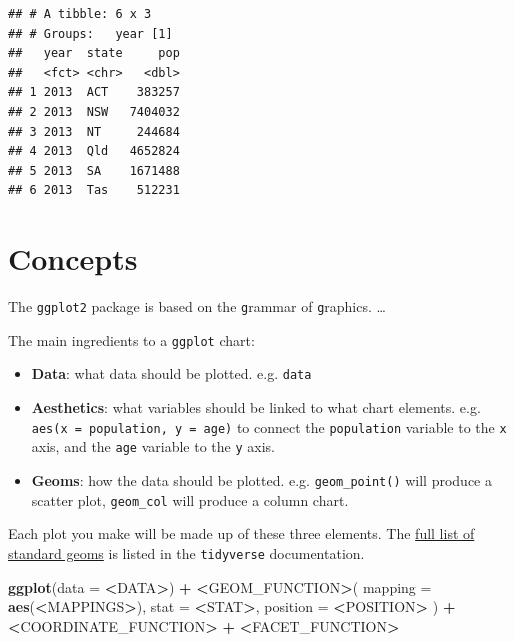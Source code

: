 \documentclass[]{book}
\newenvironment{Shaded}{\begin{snugshade}}{\end{snugshade}}
\newcommand{\DataTypeTok}[1]{\textcolor[rgb]{0.13,0.29,0.53}{#1}}
\newcommand{\ErrorTok}[1]{\textcolor[rgb]{0.64,0.00,0.00}{\textbf{#1}}}
\newcommand{\KeywordTok}[1]{\textcolor[rgb]{0.13,0.29,0.53}{\textbf{#1}}}
\newcommand{\NormalTok}[1]{#1}
\newcommand{\OperatorTok}[1]{\textcolor[rgb]{0.81,0.36,0.00}{\textbf{#1}}}
\newcommand{\StringTok}[1]{\textcolor[rgb]{0.31,0.60,0.02}{#1}}
\providecommand{\tightlist}{%
  \setlength{\itemsep}{0pt}\setlength{\parskip}{0pt}}
\begin{document}
\begin{verbatim}
## # A tibble: 6 x 3
## # Groups:   year [1]
##   year  state     pop
##   <fct> <chr>   <dbl>
## 1 2013  ACT    383257
## 2 2013  NSW   7404032
## 3 2013  NT     244684
## 4 2013  Qld   4652824
## 5 2013  SA    1671488
## 6 2013  Tas    512231
\end{verbatim}

\hypertarget{concepts}{%
\section{Concepts}\label{concepts}}

The \texttt{ggplot2} package is based on the \texttt{g}rammar of \texttt{g}raphics. \ldots{}

The main ingredients to a \texttt{ggplot} chart:

\begin{itemize}
\tightlist
\item
  \textbf{Data}: what data should be plotted. e.g. \texttt{data}
\item
  \textbf{Aesthetics}: what variables should be linked to what chart elements. e.g. \texttt{aes(x\ =\ population,\ y\ =\ age)} to connect the \texttt{population} variable to the \texttt{x} axis, and the \texttt{age} variable to the \texttt{y} axis.
\item
  \textbf{Geoms}: how the data should be plotted. e.g. \texttt{geom\_point()} will produce a scatter plot, \texttt{geom\_col} will produce a column chart.
\end{itemize}

Each plot you make will be made up of these three elements. The \href{https://ggplot2.tidyverse.org/reference/}{full list of standard geoms} is listed in the \texttt{tidyverse} documentation.

\begin{Shaded}
\begin{Highlighting}[]
\KeywordTok{ggplot}\NormalTok{(}\DataTypeTok{data =} \OperatorTok{<}\NormalTok{DATA}\OperatorTok{>}\NormalTok{) }\OperatorTok{+}\StringTok{ }
\StringTok{  }\ErrorTok{<}\NormalTok{GEOM_FUNCTION}\OperatorTok{>}\NormalTok{(}
     \DataTypeTok{mapping =} \KeywordTok{aes}\NormalTok{(}\OperatorTok{<}\NormalTok{MAPPINGS}\OperatorTok{>}\NormalTok{),}
     \DataTypeTok{stat =} \OperatorTok{<}\NormalTok{STAT}\OperatorTok{>}\NormalTok{, }
     \DataTypeTok{position =} \OperatorTok{<}\NormalTok{POSITION}\OperatorTok{>}
\StringTok{  }\NormalTok{) }\OperatorTok{+}
\StringTok{  }\ErrorTok{<}\NormalTok{COORDINATE_FUNCTION}\OperatorTok{>}\StringTok{ }\OperatorTok{+}
\StringTok{  }\ErrorTok{<}\NormalTok{FACET_FUNCTION}\OperatorTok{>}
\end{Highlighting}
\end{Shaded}
\end{document}
